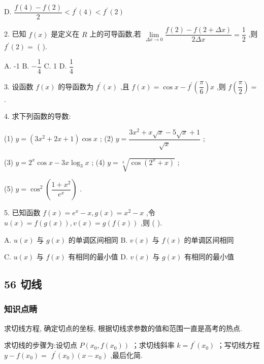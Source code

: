 D. $\dfrac{f\left( 4\right)  - f\left( 2\right) }{2} < {f}^{\prime }\left( 4\right)  < {f}^{\prime }\left( 2\right)$

2. 已知 $f\left( x\right)$ 是定义在 ${R}$ 上的可导函数,若 $\mathop{\lim }\limits_{{{\Delta x} \rightarrow  0}}\dfrac{f\left( 2\right)  - f\left( {2 + {\Delta x}}\right) }{2\Delta x} = \dfrac{1}{2}$ ,则 ${f}^{\prime }\left( 2\right)  =$ (   ).

A. -1 B. $- \dfrac{1}{4}$ C. 1 D. $\dfrac{1}{4}$

3. 设函数 $f\left( x\right)$ 的导函数为 ${f}^{\prime }\left( x\right)$ ,且 $f\left( x\right)  = \cos x - {f}^{\prime }\left( \dfrac{\pi }{6}\right) x$ ,则 $f\left( \dfrac{\pi }{2}\right)  =$ \blkda{}.

4. 求下列函数的导数:

(1) $y = \left( {3{x}^{2} + {2x} + 1}\right) \cos x$ ; (2) $y = \dfrac{3{x}^{2} + x\sqrt{x} - 5\sqrt{x} + 1}{\sqrt{x}}$ ;

(3) $y = {2}^{x}\cos x - {3x}{\log }_{3}x$ ; (4) $y = \sqrt[3]{\cos \left( {{2}^{x} + x}\right) }$ ;

(5) $y = {\cos }^{2}\left( \dfrac{1 + {x}^{2}}{{{e}}^{x}}\right)$ .

5. 已知函数 $f\left( x\right)  = {{e}}^{x} - x,g\left( x\right)  = {x}^{2} - x$ ,令 $u\left( x\right)  = f\left( {g\left( x\right) }\right) ,v\left( x\right)  = g\left( {f\left( x\right) }\right)$ ,则 (   ).

A. $u\left( x\right)$ 与 $g\left( x\right)$ 的单调区间相同 B. $v\left( x\right)$ 与 $f\left( x\right)$ 的单调区间相同

C. $u\left( x\right)$ 与 $f\left( x\right)$ 有相同的最小值 D. $v\left( x\right)$ 与 $g\left( x\right)$ 有相同的最小值

\subsection*{56 切线}

\subsubsection*{知识点睛}

求切线方程, 确定切点的坐标, 根据切线求参数的值和范围一直是高考的热点.

求切线的步骤为:设切点 $P\left( {{x}_{0},f\left( {x}_{0}\right) }\right)$ ；求切线斜率 $k = {f}^{\prime }\left( {x}_{0}\right)$ ；写切线方程 $y - f\left( {x}_{0}\right)  =$  ${f}^{\prime }\left( {x}_{0}\right) \left( {x - {x}_{0}}\right)$ ,最后化简.

